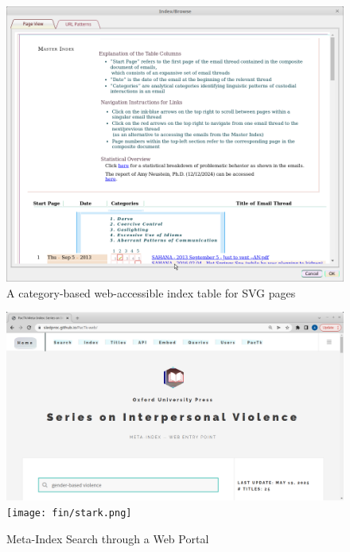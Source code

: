 \documentclass[11pt]{article}
\begin{document}
{\begin{figure}[ht]
\includegraphics[scale=0.5]{fin/sah.png}
\caption{A category-based web-accessible index table for SVG pages}
\label{fig:ss5}
\end{figure}

\begin{figure}[t!]
\includegraphics[scale=0.5]{fin/stark-mi.png}
\texttt{[image: fin/stark.png]}
\caption{Meta-Index Search through a Web Portal}
\label{fig:ss6}
\end{figure}




}
\end{document}
